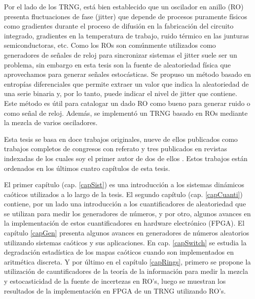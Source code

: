 Por el lado de los TRNG, está bien establecido que un oscilador en anillo (RO) presenta fluctuaciones de fase (jitter) que depende de procesos puramente físicos como gradientes durante el proceso de difusión en la fabricación del circuito integrado, gradientes en la temperatura de trabajo, ruido térmico en las junturas semiconductoras, etc.
Como los ROs son comúnmente utilizados como generadores de señales de reloj para sincronizar sistemas el jitter suele ser un problema, sin embargo en esta tesis son la fuente de aleatoriedad física que aprovechamos para generar señales estocásticas.
Se propuso un método basado en entropías diferenciales que permite extraer un valor que indica la aleatoriedad de una serie binaria y, por lo tanto, puede indicar el nivel de jitter que contiene.
Este método es útil para catalogar un dado RO como bueno para generar ruido o como señal de reloj.
Además, se implementó un TRNG basado en ROs mediante la mezcla de varios osciladores.

Esta tesis se basa en doce trabajos originales, nueve de ellos publicados como trabajos completos de congresos con referato y tres publicados en revistas indexadas de los cuales soy el primer autor de dos de ellos \cite{Acá van todos los trabajos}.
Estos trabajos están ordenados en los últimos cuatro capítulos de esta tesis.

El primer capítulo (cap. \ref{capSist}) es una introducción a los sistemas dinámicos caóticos utilizados a lo largo de la tesis.
El segundo capítulo (cap. \ref{capCuanti}) contiene, por un lado una introducción a los cuantificadores de aleatoriedad que se utilizan para medir los generadores de números, y por otro, algunos avances en la implementación de estos cuantificadores en hardware electrónico (FPGA).
El capítulo \ref{capGen} presenta algunos avances en generadores de números aleatorios utilizando sistemas caóticos y sus aplicaciones.
En cap. \ref{capSwitch} se estudia la degradación estadística de los mapas caóticos cuando son implementados en aritmética discreta.
Y por último en el capítulo \ref{capRings}, primero se propone la utilización de cauntificadores de la teoría de la información para medir la mezcla y estocasticidad de la fuente de incertezas en RO's, luego se muestran los resultados de la implementación en FPGA de un TRNG utilizando RO's.